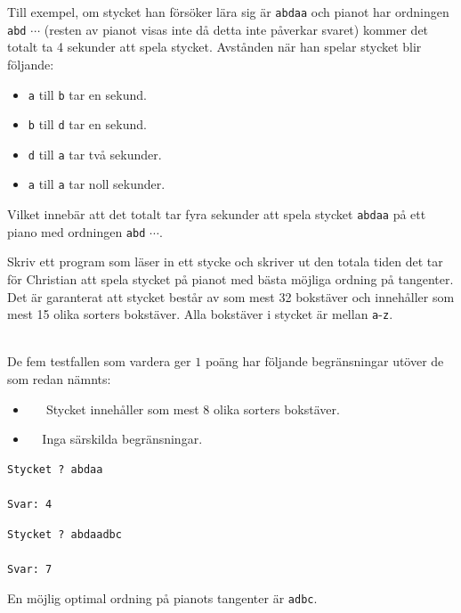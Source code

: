 Till exempel, om stycket han försöker lära sig är \texttt{abdaa} och pianot har ordningen
\texttt{abd} $\cdots$ (resten av pianot visas inte då detta inte påverkar svaret)
kommer det totalt ta 4 sekunder att spela stycket.
Avstånden när han spelar stycket blir följande:
\begin{itemize}
  \item \texttt{a} till \texttt{b} tar en sekund.
  \item \texttt{b} till \texttt{d} tar en sekund.
  \item \texttt{d} till \texttt{a} tar två sekunder.
  \item \texttt{a} till \texttt{a} tar noll sekunder.
\end{itemize}
Vilket innebär att det totalt tar fyra sekunder att spela stycket \texttt{abdaa} på ett piano
med ordningen \texttt{abd} $\cdots$.

Skriv ett program som läser in ett stycke och skriver ut den totala tiden det tar för Christian att
spela stycket på pianot med bästa möjliga ordning på tangenter. Det är garanterat att stycket
består av som mest 32 bokstäver och innehåller som mest 15 olika sorters bokstäver.
Alla bokstäver i stycket är mellan \texttt{a}-\texttt{z}.

\\
De fem testfallen som vardera ger $1$ poäng har följande begränsningar utöver de som redan nämnts:
\begin{itemize}
    \item[(1)] $\;\;\;\;$ Stycket innehåller som mest 8 olika sorters bokstäver. 
    \item[(2-5)] $\;\;\;\; $Inga särskilda begränsningar.
\end{itemize}


\begin{verbatim}
Stycket ? abdaa

Svar: 4
\end{verbatim}

\begin{verbatim}
Stycket ? abdaadbc

Svar: 7
\end{verbatim}

En möjlig optimal ordning på pianots tangenter är \texttt{adbc}.


